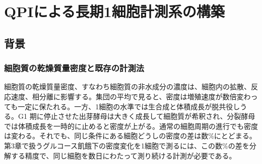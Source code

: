 \chapter{QPIによる長期1細胞計測系の構築}

\section{背景}
\label{sec:background}

\subsection{細胞質の乾燥質量密度と既存の計測法}

細胞質の乾燥質量密度、すなわち細胞質の非水成分の濃度は、細胞内の拡散、反応速度、相分離に影響する\cite{ellis2001crowding,delarue2018mtorc1,molines2022cytoplasm}。集団の平均で見ると、密度は増殖速度が数倍変わっても一定に保たれる\cite{kubitschek1984independence,kubitschek1985buoyant}。一方、1細胞の水準では生合成と体積成長が脱共役しうる。G1 期に停止させた出芽酵母は大きく成長して細胞質が希釈され\cite{neurohr2019excessive}、分裂酵母では体積成長を一時的に止めると密度が上がる\cite{knapp2019decoupling}。通常の細胞周期の進行でも密度は変わる\cite{odermatt2021variations,zlotekzlotkiewicz2015optical}。それでも、同じ条件にある細胞どうしの密度の差は数\%にとどまる\cite{oldewurtel2021robust,odermatt2021variations,liu2022uniformity}。第3章で扱うグルコース飢餓下の密度変化を1細胞で測るには、この数\%の差を分解する精度で、同じ細胞を数日にわたって測り続ける計測が必要である。

